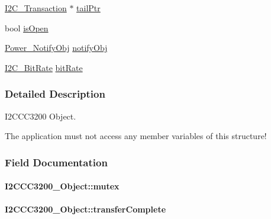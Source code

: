 \begin{DoxyCompactItemize}
\item 
\hyperlink{struct_i2_c___transaction}{I2\+C\+\_\+\+Transaction} $\ast$ \hyperlink{struct_i2_c_c_c3200___object_aacdebea30364cebd4019b2b7b1168033}{tail\+Ptr}
\item 
bool \hyperlink{struct_i2_c_c_c3200___object_a12b1ef0cb50aca717bf99a0a3a79c23f}{is\+Open}
\item 
\hyperlink{struct_power___notify_obj}{Power\+\_\+\+Notify\+Obj} \hyperlink{struct_i2_c_c_c3200___object_ad066cb00911111259f89c5453b6b8f0a}{notify\+Obj}
\item 
\hyperlink{_i2_c_8h_ac954e3197f04c50293db466c4abb6fbe}{I2\+C\+\_\+\+Bit\+Rate} \hyperlink{struct_i2_c_c_c3200___object_ae491dd1f361043e9cb0d4dc54ee737a2}{bit\+Rate}
\end{DoxyCompactItemize}


\subsubsection{Detailed Description}
I2\+C\+C\+C3200 Object. 

The application must not access any member variables of this structure! 

\subsubsection{Field Documentation}
\paragraph[{mutex}]{ I2\+C\+C\+C3200\+\_\+\+Object\+::mutex}\label{struct_i2_c_c_c3200___object_a7e7772eb01292cc0b62c4581e3820019}
\paragraph[{transfer\+Complete}]{ I2\+C\+C\+C3200\+\_\+\+Object\+::transfer\+Complete}\label{struct_i2_c_c_c3200___object_acb48c5a20c3eabff5c8598fff3101322}

